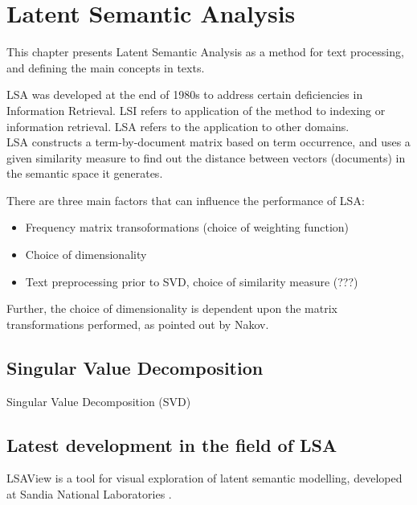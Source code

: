 \chapter{Latent Semantic Analysis}
\label{sec:lsa}

\begin{summary}
This chapter presents Latent Semantic Analysis as a method for text processing, and defining the main concepts in texts.
\end{summary}

\gls{LSA} was developed at the end of 1980s to address certain deficiencies in Information Retrieval.
\gls{LSI} refers to application of the method to indexing or information retrieval. \gls{LSA} refers to the application to other domains.\\

\gls{LSA}  constructs a term-by-document matrix based on term occurrence, and uses a given similarity measure to find out the distance between vectors (documents) in the semantic space it generates.

There are three main factors that can influence the performance of LSA\cite{Nakov_weightfunctions}\cite{NakovBetterResultsLSI}:\\
\begin{itemize}
\item Frequency matrix transoformations (choice of weighting function)
\item Choice of dimensionality
\item Text preprocessing prior to SVD, choice of similarity measure (???)
\end{itemize}

Further, the choice of dimensionality is dependent upon the matrix transformations performed, as pointed out by Nakov\cite{NakovBetterResultsLSI}.\\

\section{Singular Value Decomposition}
Singular Value Decomposition (SVD)

\section{Latest development in the field of LSA}
LSAView is a tool for visual exploration of latent semantic modelling, developed at Sandia National Laboratories \cite{CrDuSh09}.\\

